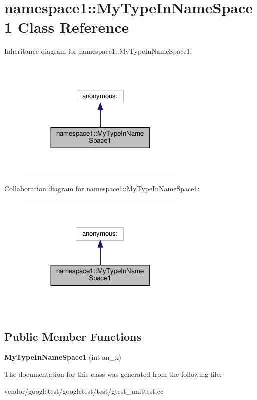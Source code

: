 \hypertarget{classnamespace1_1_1_my_type_in_name_space1}{}\section{namespace1\+:\+:My\+Type\+In\+Name\+Space1 Class Reference}
\label{classnamespace1_1_1_my_type_in_name_space1}


Inheritance diagram for namespace1\+:\+:My\+Type\+In\+Name\+Space1\+:
\nopagebreak
\begin{figure}[H]
\begin{center}
\leavevmode
\includegraphics[width=228pt]{classnamespace1_1_1_my_type_in_name_space1__inherit__graph}
\end{center}
\end{figure}


Collaboration diagram for namespace1\+:\+:My\+Type\+In\+Name\+Space1\+:
\nopagebreak
\begin{figure}[H]
\begin{center}
\leavevmode
\includegraphics[width=228pt]{classnamespace1_1_1_my_type_in_name_space1__coll__graph}
\end{center}
\end{figure}
\subsection*{Public Member Functions}
\begin{DoxyCompactItemize}
\item 
\mbox{\label{classnamespace1_1_1_my_type_in_name_space1_a2e4277aa118e9b83045a18392188a0d8}} 
{\bfseries My\+Type\+In\+Name\+Space1} (int an\+\_\+x)
\end{DoxyCompactItemize}


The documentation for this class was generated from the following file\+:\begin{DoxyCompactItemize}
\item 
vendor/googletest/googletest/test/gtest\+\_\+unittest.\+cc\end{DoxyCompactItemize}

